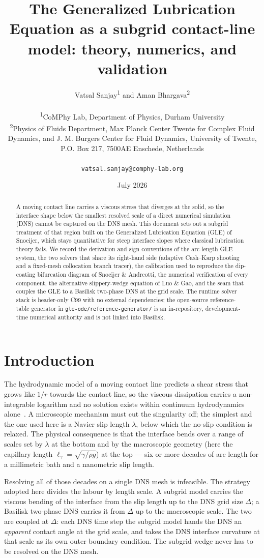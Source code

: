 \documentclass[11pt,a4paper]{article}
\title{The Generalized Lubrication Equation as a subgrid
  contact-line model: theory, numerics, and validation}
\author{Vatsal Sanjay\textsuperscript{1} and
  Aman Bhargava\textsuperscript{2}\\[4pt]
  \parbox{0.92\textwidth}{\centering
    \small \textsuperscript{1}CoMPhy Lab, Department of Physics,
      Durham University\\
    \small \textsuperscript{2}Physics of Fluids Department, Max Planck Center
      Twente for Complex Fluid Dynamics, and J. M. Burgers Center for Fluid
      Dynamics, University of Twente, P.O. Box 217, 7500AE Enschede,
      Netherlands}\\[2pt]
  \small \texttt{vatsal.sanjay@comphy-lab.org}}
\date{July 2026}
\newcommand{\lgamma}{\ell_\gamma}
\begin{document}
\maketitle

\begin{abstract}
\noindent
A moving contact line carries a viscous stress that diverges at the solid,
so the interface shape below the smallest resolved scale of a direct
numerical simulation (DNS) cannot be captured on the DNS mesh. This document
sets out a subgrid treatment of that region built on the Generalized
Lubrication Equation (GLE) of Snoeijer, which stays quantitative for steep
interface slopes where classical lubrication theory fails. We record the
derivation and sign conventions of the arc-length GLE system, the two solvers
that share its right-hand side (adaptive Cash--Karp shooting and a
fixed-mesh collocation branch tracer), the calibration used to reproduce the
dip-coating bifurcation diagram of Snoeijer \& Andreotti, the numerical
verification of every component, the alternative slippery-wedge equation of
Luo \& Gao, and the seam that couples the GLE to a Basilisk two-phase DNS at
the grid scale. The runtime solver stack is header-only C99 with no external
dependencies; the open-source reference-table generator in
\texttt{gle-ode/reference-generator/} is an in-repository, development-time
numerical authority and is not linked into Basilisk.
\end{abstract}

\section{Introduction}

The hydrodynamic model of a moving contact line predicts a shear stress that
grows like $1/r$ towards the contact line, so the viscous dissipation carries
a non-integrable logarithm and no solution exists within continuum
hydrodynamics alone~\cite{huhscriven1971}. A microscopic mechanism must cut
the singularity off; the simplest and the one used here is a Navier slip
length $\lambda$, below which the no-slip condition is relaxed. The physical
consequence is that the interface bends over a range of scales set by
$\lambda$ at the bottom and by the macroscopic geometry (here the capillary
length $\lgamma = \sqrt{\gamma/\rho g}$) at the top --- six or more decades of
arc length for a millimetric bath and a nanometric slip length.

Resolving all of those decades on a single DNS mesh is infeasible. The
strategy adopted here divides the labour by length scale. A subgrid model
carries the viscous bending of the interface from the slip length up to the
DNS grid size $\Delta$; a Basilisk two-phase DNS carries it from $\Delta$ up
to the macroscopic scale. The two are coupled at $\Delta$: each DNS time step
the subgrid model hands the DNS an \emph{apparent} contact angle at the grid
scale, and takes the DNS interface curvature at that scale as its own outer
boundary condition. The subgrid wedge never has to be resolved on the DNS
mesh.
\end{document}
